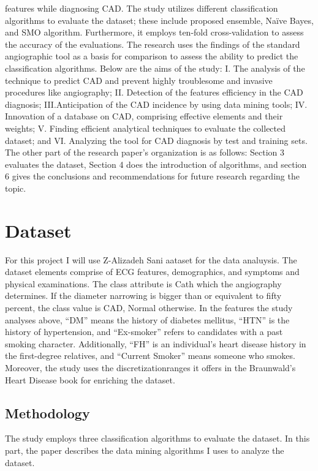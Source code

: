 \documentclass[sigconf]{acmart}
\begin{document}
features while diagnosing  CAD. The study utilizes different classification algorithms to evaluate the dataset; these include proposed ensemble, Naïve Bayes, and SMO algorithm. Furthermore, it employs ten-fold cross-validation to assess the accuracy of the evaluations. The research uses the findings of the standard angiographic tool as a basis for comparison to assess the ability to predict the classification algorithms. Below are the aims of the study:
I.	The analysis of the technique to predict CAD and prevent highly troublesome and invasive procedures like angiography;
II.	Detection of the features efficiency in the CAD diagnosis;
III.Anticipation of the CAD incidence by using data mining tools;
IV.	Innovation of a database on CAD, comprising effective elements and their weights;
V.	Finding efficient analytical techniques to evaluate the collected dataset; and
VI.	Analyzing the tool for CAD diagnosis by test and training sets.
The other part of the research paper’s organization is as follows: Section 3 evaluates the dataset, Section 4 does the introduction of algorithms, and section 6 gives the conclusions and recommendations for future research regarding the topic.

\section{Dataset}
For this project I will use Z-Alizadeh Sani aataset for the data analuysis.
The dataset elements comprise of ECG features, demographics, and symptoms and physical examinations. 
The class attribute is Cath which the angiography determines. If the diameter narrowing is bigger than or equivalent to fifty percent, the class value is CAD, Normal otherwise. In the features the study analyses above, “DM” means the history of diabetes mellitus, “HTN” is the history of hypertension, and “Ex-smoker” refers to candidates with a past smoking character. Additionally, “FH” is an individual’s heart disease history in the first-degree relatives, and “Current Smoker” means someone who smokes. Moreover, the study uses the discretizationranges it offers in the Braunwald’s Heart Disease book for enriching the dataset.

\subsection{Methodology}

The study employs three classification algorithms to evaluate the dataset. In this part, the paper describes the data mining algorithms I uses to analyze the dataset.
\end{document}
